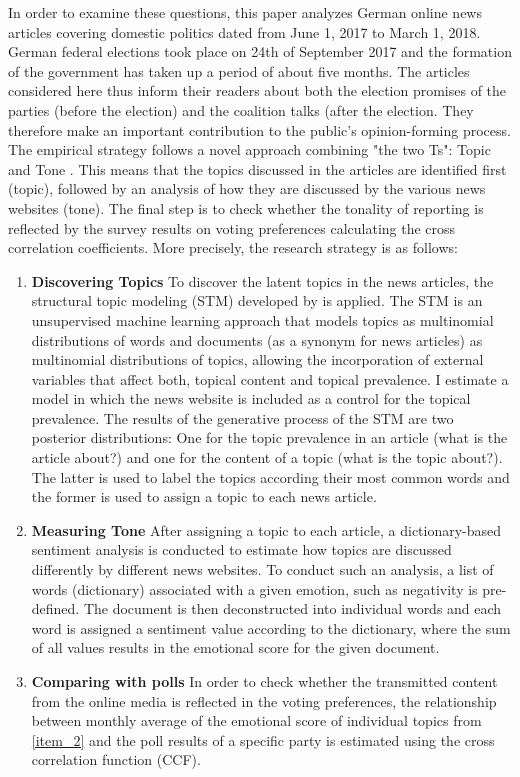 \documentclass[12pt,a4paper,notitlepage]{article}
\begin{document}
In order to examine these questions, this paper analyzes German online news articles covering domestic politics dated from June 1, 2017 to March 1, 2018. German federal elections took place on 24th of September 2017 and the formation of the government has taken up a period of about five months. The articles considered here thus inform their readers about both the election promises of the parties (before the election) and the coalition talks (after the election. They therefore make an important contribution to the public's opinion-forming process. The empirical strategy follows a novel approach combining "the two Ts": Topic and Tone \citep{hansen_shocking_2016}. This means that the topics discussed in the articles are identified first (topic), followed by an analysis of how they are discussed by the various news websites (tone). The final step is to check whether the tonality of reporting is reflected by the survey results on voting preferences calculating the cross correlation coefficients. More precisely, the research strategy is as follows:

\begin{enumerate}
	\item\label{item_1} \textbf{Discovering Topics} To discover the latent topics in the news articles, the structural topic modeling (STM) developed by \citet{roberts_model_2016} is applied. The STM is an unsupervised machine learning approach that models topics as multinomial distributions of words and documents (as a synonym for news articles) as multinomial distributions of topics, allowing the incorporation of external variables that affect both, topical content and topical prevalence. I estimate a model in which the news website is included as a control for the topical prevalence. The results of the generative process of the STM are two posterior distributions: One for the topic prevalence in an article (what is the article about?) and one for the content of a topic (what is the topic about?). The latter is used to label the topics according their most common words and the former is used to assign a topic to each news article. 
	\item\label{item_2} \textbf{Measuring Tone} After assigning a topic to each article, a dictionary-based sentiment analysis is conducted to estimate how topics are discussed differently by different news websites. To conduct such an analysis, a list of words (dictionary) associated with a given emotion, such as negativity is pre-defined. The document is then deconstructed into individual words and each word is assigned a sentiment value according to the dictionary, where the sum of all values results in the emotional score for the given document.   
	\item\label{item_3} \textbf{Comparing with polls} In order to check whether the transmitted content from the online media is reflected in the voting preferences, the relationship between monthly average of the emotional score of individual topics from \ref{item_2} and the poll results of a specific party is estimated using the cross correlation function (CCF).
\end{enumerate}
\end{document}
